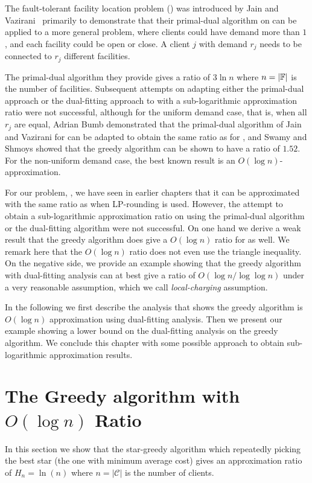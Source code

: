 \documentclass[oneside,final]{ucr}
\begin{document}
The fault-tolerant facility location problem ({\FTFL}) was
introduced by Jain and Vazirani~\cite{JainV03} primarily to
demonstrate that their primal-dual algorithm on {\UFL} can
be applied to a more general problem, where clients could
have demand more than $1$, and each facility could be open
or close. A client $j$ with demand $r_j$ needs to be
connected to $r_j$ different facilities.

The primal-dual algorithm they provide gives a ratio of
$3\ln n$ where $n=|\mathbb{F}|$ is the number of
facilities. Subsequent attempts on adapting either the
primal-dual approach or the dual-fitting approach to {\FTFL}
with a sub-logarithmic approximation ratio were not
successful, although for the uniform demand case, that is,
when all $r_j$ are equal, Adrian Bumb demonstrated that the
primal-dual algorithm of Jain and Vazirani for {\UFL} can be
adapted to obtain the same ratio as for {\UFL}, and Swamy
and Shmoys showed that the greedy algorithm can be shown to
have a ratio of $1.52$. For the non-uniform demand case, the
best known result is an $O(\log n)$-approximation.

For our problem, {\FTFP}, we have seen in earlier chapters
that it can be approximated with the same ratio as {\UFL}
when LP-rounding is used. However, the attempt to obtain a
sub-logarithmic approximation ratio on {\FTFP} using the
primal-dual algorithm or the dual-fitting algorithm were not
successful. On one hand we derive a weak result that the
greedy algorithm does give a $O(\log n)$ ratio for {\FTFP}
as well. We remark here that the $O(\log n)$ ratio does not
even use the triangle inequality. On the negative side, we
provide an example showing that the greedy algorithm with
dual-fitting analysis can at best give a ratio of $O(\log n/
\log\log n)$ under a very reasonable assumption, which we
call \emph{local-charging} assumption.

In the following we first describe the analysis that shows
the greedy algorithm is $O(\log n)$ approximation using
dual-fitting analysis. Then we present our example showing a
lower bound on the dual-fitting analysis on the greedy
algorithm. We conclude this chapter with some possible
approach to obtain sub-logarithmic approximation results.

\section{The Greedy algorithm with $O(\log n)$ Ratio}
\label{sec:upp}
In this section we show that the star-greedy algorithm which
repeatedly picking the best star (the one with minimum
average cost) gives an approximation ratio of $H_n = \ln(n)$
where $n=|\mathcal{C}|$ is the number of clients.
\end{document}
